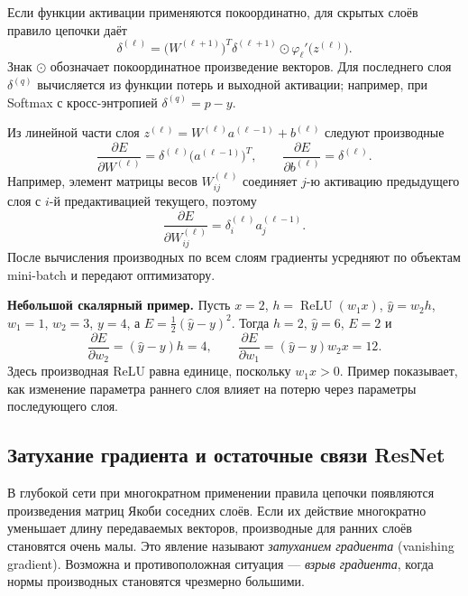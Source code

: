 \documentclass[12pt,a4paper]{article}
\begin{document}
Если функции активации применяются покоординатно,
для скрытых слоёв правило цепочки даёт
\begin{equation}
    \boxed{\delta^{(\ell)}=
    \bigl(W^{(\ell+1)}\bigr)^T\delta^{(\ell+1)}
    \odot \varphi_\ell'\bigl(z^{(\ell)}\bigr)}.
    \label{eq:backprop-recursion}
\end{equation}
Знак $\odot$ обозначает покоординатное произведение векторов.
Для последнего слоя $\delta^{(q)}$ вычисляется
из функции потерь и выходной активации; например,
при Softmax с кросс-энтропией
$\delta^{(q)}=p-y$.

Из линейной части слоя
$z^{(\ell)}=W^{(\ell)}a^{(\ell-1)}+b^{(\ell)}$
следуют производные
\begin{equation}
    \boxed{\frac{\partial E}{\partial W^{(\ell)}}
      =\delta^{(\ell)}\bigl(a^{(\ell-1)}\bigr)^T},
    \qquad
    \frac{\partial E}{\partial b^{(\ell)}}=\delta^{(\ell)}.
    \label{eq:backprop-weights}
\end{equation}
Например, элемент матрицы весов $W^{(\ell)}_{ij}$
соединяет $j$-ю активацию предыдущего слоя с $i$-й
предактивацией текущего, поэтому
\[
    \frac{\partial E}{\partial W_{ij}^{(\ell)}}
    =\delta_i^{(\ell)}a_j^{(\ell-1)}.
\]
После вычисления производных по всем слоям градиенты
усредняют по объектам mini-batch и передают оптимизатору.

\textbf{Небольшой скалярный пример.} Пусть $x=2$,
$h=\operatorname{ReLU}(w_1x)$, $\widehat y=w_2h$,
$w_1=1$, $w_2=3$, $y=4$, а
$E=\tfrac12(\widehat y-y)^2$.
Тогда $h=2$, $\widehat y=6$, $E=2$ и
\[
    \frac{\partial E}{\partial w_2}
      =(\widehat y-y)h=4,
    \qquad
    \frac{\partial E}{\partial w_1}
      =(\widehat y-y)w_2x=12.
\]
Здесь производная ReLU равна единице, поскольку $w_1x>0$.
Пример показывает, как изменение параметра раннего слоя
влияет на потерю через параметры последующего слоя.

\subsection{Затухание градиента и остаточные связи ResNet}

В глубокой сети при многократном применении правила цепочки
появляются произведения матриц Якоби соседних слоёв.
Если их действие многократно уменьшает длину передаваемых
векторов, производные для ранних слоёв становятся очень малы.
Это явление называют \emph{затуханием градиента}
(vanishing gradient).
Возможна и противоположная ситуация --- \emph{взрыв градиента},
когда нормы производных становятся чрезмерно большими.
\end{document}
